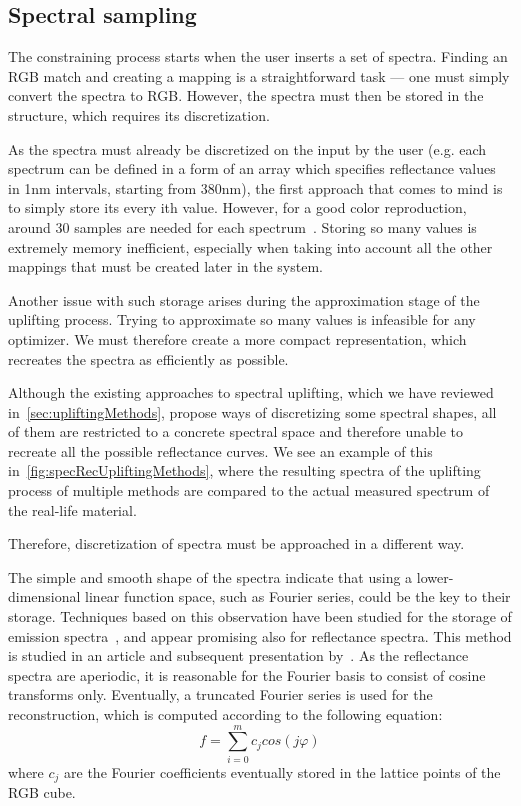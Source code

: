 \subsection{Spectral sampling}

The constraining process starts when the user inserts a set of spectra. Finding an RGB match and creating a mapping is a straightforward task --- one must simply convert the spectra to RGB. However, the spectra must then be stored in the structure, which requires its discretization.

As the spectra must already be discretized on the input by the user (e.g. each spectrum can be defined in a form of an array which specifies reflectance values in 1nm intervals, starting from 380nm), the first approach that comes to mind is to simply store its every ith value. However, for a good color reproduction, around 30 samples are needed for each spectrum~\cite{trigonometricMomentsPresentation}. Storing so many values is extremely memory inefficient, especially when taking into account all the other mappings that must be created later in the system.

Another issue with such storage arises during the approximation stage of the uplifting process. Trying to approximate so many values is infeasible for any optimizer. We must therefore create a more compact representation, which recreates the spectra as efficiently as possible.

Although the existing approaches to spectral uplifting, which we have reviewed in~\cref{sec:upliftingMethods}, propose ways of discretizing some spectral shapes, all of them are restricted to a concrete spectral space and therefore unable to recreate all the possible reflectance curves. We see an example of this in~\cref{fig:specRecUpliftingMethods}, where the resulting spectra of the uplifting process of multiple methods are compared to the actual measured spectrum of the real-life material.

Therefore, discretization of spectra must be approached in a different way.

The simple and smooth shape of the spectra indicate that using a lower-dimensional linear function space, such as Fourier series, could be the key to their storage. Techniques based on this observation have been studied for the storage of emission spectra~\cite{fourierRepresEmission}, and appear promising also for reflectance spectra. This method is studied in an article and subsequent presentation by~\citet{trigonometricMomentsPresentation}. As the reflectance spectra are aperiodic, it is reasonable for the Fourier basis to consist of cosine transforms only. Eventually, a truncated Fourier series is used for the reconstruction, which is computed according to the following equation:
\begin{equation} \label{truncatedFourierSeries}
  f = \sum_{i=0}^{m}c_j cos(j\varphi)
\end{equation}
where $c_j$ are the Fourier coefficients eventually stored in the lattice points of the RGB cube.

